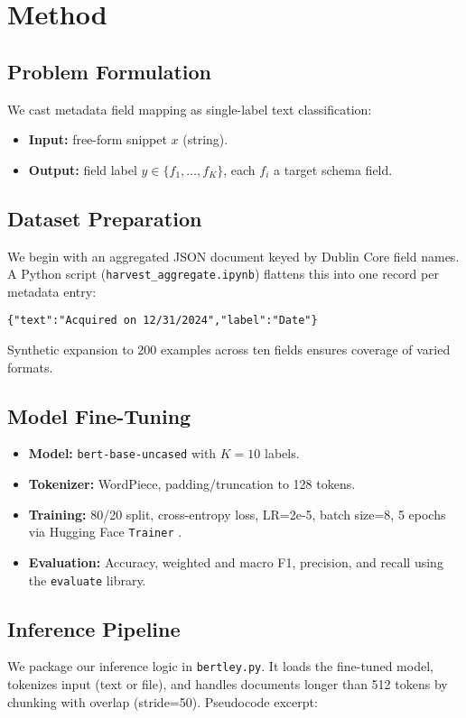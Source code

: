 \documentclass[conference]{IEEEtran}
\begin{document}
\section{Method}
\subsection{Problem Formulation}
We cast metadata field mapping as single-label text classification:
\begin{itemize}
  \item \textbf{Input:} free-form snippet $x$ (string).
  \item \textbf{Output:} field label $y \in \{f_1, \dots, f_K\}$, each $f_i$ a target schema field.
\end{itemize}

\subsection{Dataset Preparation}
We begin with an aggregated JSON document keyed by Dublin Core field names. A Python script (\texttt{harvest\_aggregate.ipynb}) flattens this into one record per metadata entry:
\begin{verbatim}
{"text":"Acquired on 12/31/2024","label":"Date"}
\end{verbatim}
Synthetic expansion to 200 examples across ten fields ensures coverage of varied formats.

\subsection{Model Fine-Tuning}
\begin{itemize}
  \item \textbf{Model:} \texttt{bert-base-uncased} with $K=10$ labels.
  \item \textbf{Tokenizer:} WordPiece, padding/truncation to 128 tokens.
  \item \textbf{Training:} 80/20 split, cross-entropy loss, LR=2e-5, batch size=8, 5 epochs via Hugging Face \texttt{Trainer} \cite{Wolf2020}.
  \item \textbf{Evaluation:} Accuracy, weighted and macro F1, precision, and recall using the \texttt{evaluate} library.
\end{itemize}

\subsection{Inference Pipeline}
We package our inference logic in \texttt{bertley.py}. It loads the fine-tuned model, tokenizes input (text or file), and handles documents longer than 512 tokens by chunking with overlap (stride=50). Pseudocode excerpt:
\end{document}
